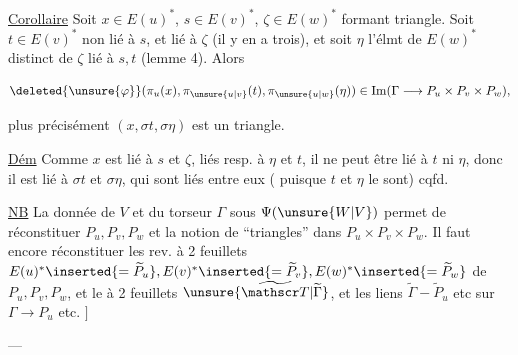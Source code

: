 \uline{Corollaire} Soit $x\in E(u)^*$, $s\in E(v)^*$, $\zeta\in E(w)^*$ formant triangle.  Soit  $t\in E(v)^*$  non lié à $s$, et lié à $\zeta$ (il y en a trois), et soit $\eta$ l'élmt de $E(w)^*$ distinct de $\zeta$ lié à $s,t$ (lemme 4). Alors

\[
\deleted{\unsure{\varphi}}(\pi_u(x),\pi_{\unsure{u|v}}(t),\pi_{\unsure{u|w}}(\eta))\in\operatorname{Im}(\Gamma\longrightarrow P_u\times P_v\times P_w),
\]

  plus précisément $(x,\sigma t,\sigma\eta)$ est un triangle.


\uline{Dém} Comme $x$ est lié à $s$ et $\zeta$, liés resp. à $\eta$ et $t$, il ne peut être lié à $t$ ni $\eta$, donc il est lié à $\sigma t$ et $\sigma\eta$, qui sont liés entre eux ( puisque $t$ et $\eta$ le sont) cqfd.


\uline{NB} La donnée de $V$ et du torseur $\Gamma$ sous $\Psi(\unsure{W|V})$ permet de réconstituer $P_u,P_v,P_w$ et la notion de ``triangles'' dans $P_u\times P_v\times P_w$. Il faut encore réconstituer les rev. à 2 feuillets $E(u)^*\inserted{=\widetilde P_u},E(v)^*\inserted{=\widetilde P_v},E(w)^*\inserted{=\widetilde P_w}$ de $P_u,P_v,P_w$, et le  à 2 feuillets $\unsure{\widetilde{\mathscr T}|\widetilde\Gamma}$, et les liens $\widetilde\Gamma\mathbin{-}\widetilde P_u$ etc sur $\Gamma\to P_u$ etc. $\big]$

\noindent ---

